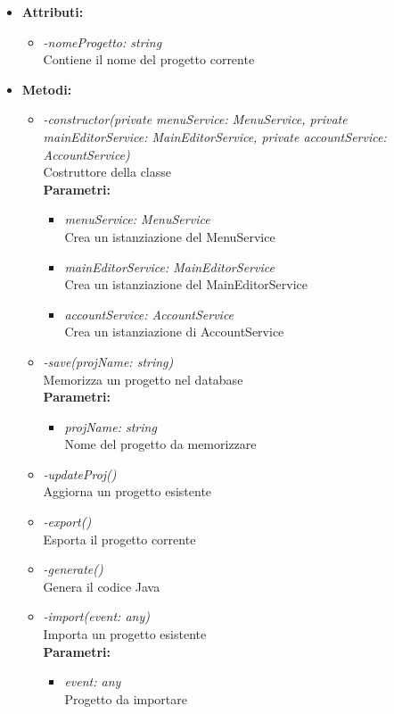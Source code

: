 \begin{itemize}
	\item \textbf{Attributi:}
		\begin{itemize}
			\item \emph{-nomeProgetto: string}\\
			Contiene il nome del progetto corrente
		\end{itemize}
	\item \textbf{Metodi:}
		\begin{itemize}
			\item \emph{-constructor(private menuService: MenuService,
    private mainEditorService: MainEditorService,
    private accountService: AccountService)}\\
    		Costruttore della classe\\
    		\textbf{Parametri:}
    		\begin{itemize}
    			\item \emph{menuService: MenuService}\\
    			Crea un istanziazione del MenuService
    			\item \emph{mainEditorService: MainEditorService}\\
    			Crea un istanziazione del MainEditorService
    			\item \emph{accountService: AccountService}\\
    			Crea un istanziazione di AccountService
    		\end{itemize}
    		\item \emph{-save(projName: string)}\\
    		Memorizza un progetto nel database\\
    		\textbf{Parametri:}
    		\begin{itemize}
    			\item \emph{projName: string}\\
    			Nome del progetto da memorizzare
    		\end{itemize}
    		\item \emph{-updateProj()}\\
    		Aggiorna un progetto esistente
    		\item \emph{-export()}\\
    		Esporta il progetto corrente
    		\item \emph{-generate()}\\
    		Genera il codice Java
    		\item \emph{-import(event: any)}\\
    		Importa un progetto esistente\\
    		\textbf{Parametri:}
    		\begin{itemize}
    			\item \emph{event: any}\\
    			Progetto da importare
    		\end{itemize}
		\end{itemize}
\end{itemize}